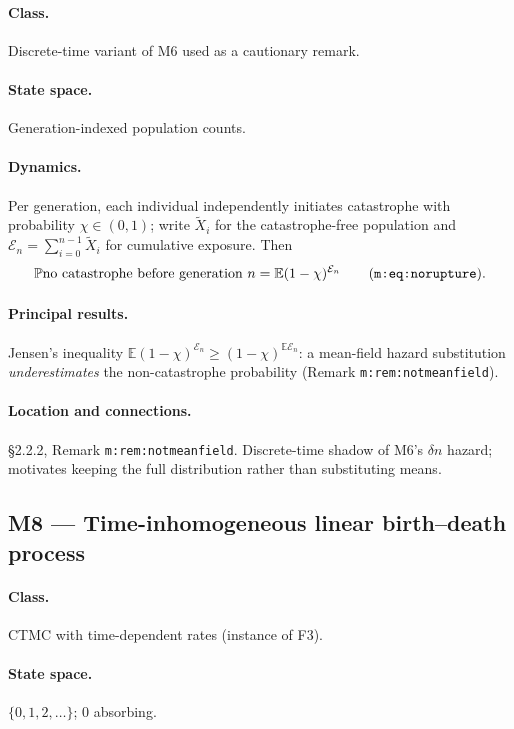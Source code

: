 \documentclass[11pt,a4paper]{article}
\newcommand{\PR}{\mathbb{P}}
\newcommand{\EX}{\mathbb{E}}
\begin{document}
\paragraph{Class.} Discrete-time variant of M6 used as a cautionary remark.

\paragraph{State space.} Generation-indexed population counts.

\paragraph{Dynamics.} Per generation, each individual independently
initiates catastrophe with probability $\chi\in(0,1)$; write
$\widetilde X_i$ for the catastrophe-free population and
$\mathcal E_n=\sum_{i=0}^{n-1}\widetilde X_i$ for cumulative exposure. Then
\[
\PR{\text{no catastrophe before generation }n}
=\EX{(1-\chi)^{\mathcal E_n}}
\qquad\text{(\texttt{m:eq:norupture})}.
\]

\paragraph{Principal results.} Jensen's inequality
$\EX{(1-\chi)^{\mathcal E_n}}\ge(1-\chi)^{\EX{\mathcal E_n}}$: a mean-field
hazard substitution \emph{underestimates} the non-catastrophe probability
(Remark \texttt{m:rem:notmeanfield}).

\paragraph{Location and connections.} \S2.2.2, Remark
\texttt{m:rem:notmeanfield}. Discrete-time shadow of M6's $\delta n$
hazard; motivates keeping the full distribution rather than substituting
means.

\subsection{M8 --- Time-inhomogeneous linear birth--death process}

\paragraph{Class.} CTMC with time-dependent rates (instance of F3).

\paragraph{State space.} $\{0,1,2,\ldots\}$; $0$ absorbing.
\end{document}
